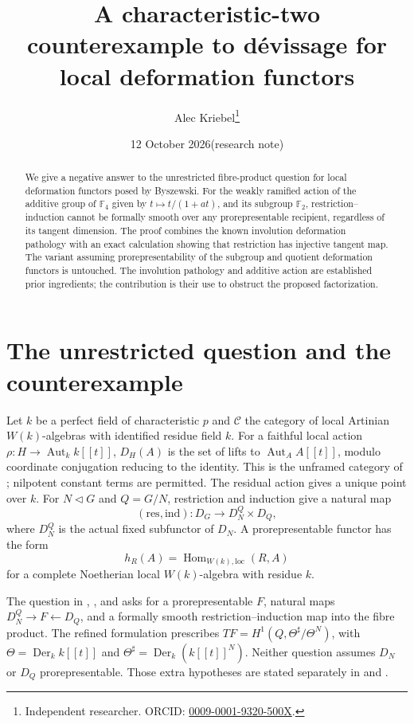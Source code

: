 \documentclass[11pt]{article}
\title{A characteristic-two counterexample to d\'evissage\newline
for local deformation functors}
\author{Alec Kriebel\thanks{Independent researcher. ORCID:
\href{https://orcid.org/0009-0001-9320-500X}{0009-0001-9320-500X}.}}
\date{12 October 2026\quad (research note)}
\newcommand{\F}{\mathbb F}
\newcommand{\Th}{\Theta}
\begin{document}
\maketitle
\begin{abstract}
We give a negative answer to the unrestricted fibre-product question for
local deformation functors posed by Byszewski. For the weakly ramified action
of the additive group of $\F_4$ given by $t\mapsto t/(1+at)$, and its subgroup
$\F_2$, restriction--induction cannot be formally smooth over any
prorepresentable recipient, regardless of its tangent dimension. The proof
combines the known involution deformation pathology with an exact calculation
showing that restriction has injective tangent map. The variant assuming
prorepresentability of the subgroup and quotient deformation functors is
untouched. The involution pathology and additive action are established prior
ingredients; the contribution is their use to obstruct the proposed
factorization.
\end{abstract}

\section{The unrestricted question and the counterexample}
Let $k$ be a perfect field of characteristic $p$ and $\mathcal C$ the category
of local Artinian $W(k)$-algebras with identified residue field $k$.
For a faithful local action $\rho:H\to\operatorname{Aut}_k k[[t]]$,
$D_H(A)$ is the set of lifts to $\operatorname{Aut}_A A[[t]]$, modulo
coordinate conjugation reducing to the identity. This is the unframed
category of \cite{OWR,Byszewski,BC}; nilpotent constant terms are permitted.
The residual action gives a unique point over $k$.
For $N\triangleleft G$ and $Q=G/N$, restriction and induction give a natural map
\[
 (\mathrm{res},\mathrm{ind}):D_G\longrightarrow D_N^Q\times D_Q,
\]
where $D_N^Q$ is the actual fixed subfunctor of $D_N$.
A prorepresentable functor has the form
\[
 h_R(A)=\operatorname{Hom}_{W(k),\mathrm{loc}}(R,A)
\]
for a complete Noetherian local $W(k)$-algebra with residue $k$.

The question in \cite[p.~3039]{OWR}, \cite[Question~6.4.4]{Thesis}, and
\cite[Question~4.4]{Byszewski} asks for a prorepresentable $F$, natural maps
$D_N^Q\to F\leftarrow D_Q$, and a formally smooth restriction--induction map
into the fibre product. The refined formulation prescribes
$TF=H^1(Q,\Th^\sharp/\Th^N)$, with
$\Th=\operatorname{Der}_k k[[t]]$ and
$\Th^\sharp=\operatorname{Der}_k(k[[t]]^N)$.
Neither question assumes $D_N$ or $D_Q$ prorepresentable. Those extra
hypotheses are stated separately in \cite[Theorem~3]{OWR} and
\cite[Remark~4.5, Theorem~4.9]{Byszewski}.
\end{document}
